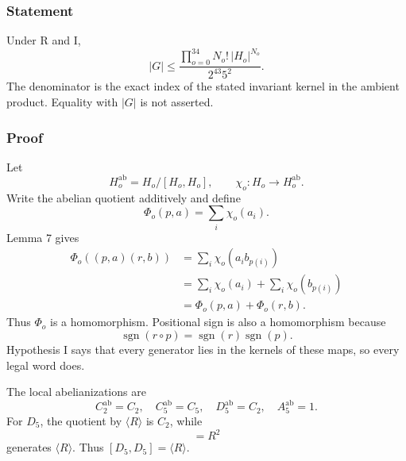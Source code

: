 \documentclass[
  10pt,
  a4paper,
]{article}
\begin{document}
\subsubsection{Statement}\label{statement-7}

Under R and I, \begin{equation}
|G|
\le
\frac{\displaystyle\prod_{o=0}^{34}N_o!\,|H_o|^{N_o}}
{2^{43}5^2}.
\end{equation} The denominator is the exact index of the stated
invariant kernel in the ambient product. Equality with \(|G|\) is not
asserted.

\subsubsection{Proof}\label{proof-7}

Let \begin{equation}
H_o^{\mathrm{ab}}=H_o/[H_o,H_o],
\qquad
\chi_o:H_o\to H_o^{\mathrm{ab}}.
\end{equation} Write the abelian quotient additively and define
\begin{equation}
\Phi_o(p,a)=\sum_i\chi_o(a_i).
\end{equation} Lemma 7 gives \begin{equation}
\begin{aligned}
\Phi_o((p,a)(r,b))
&=\sum_i\chi_o(a_i b_{p(i)})\\
&=\sum_i\chi_o(a_i)+\sum_i\chi_o(b_{p(i)})\\
&=\Phi_o(p,a)+\Phi_o(r,b).
\end{aligned}
\end{equation} Thus \(\Phi_o\) is a homomorphism. Positional sign is
also a homomorphism because \begin{equation}
\operatorname{sgn}(r\circ p)=\operatorname{sgn}(r)\operatorname{sgn}(p).
\end{equation} Hypothesis I says that every generator lies in the
kernels of these maps, so every legal word does.

The local abelianizations are \begin{equation}
C_2^{\mathrm{ab}}=C_2,\quad
C_5^{\mathrm{ab}}=C_5,\quad
D_5^{\mathrm{ab}}=C_2,\quad
A_5^{\mathrm{ab}}=1.
\end{equation} For \(D_5\), the quotient by \(\langle R\rangle\) is
\(C_2\), while \begin{equation}
[R,F]=R^2
\end{equation} generates \(\langle R\rangle\). Thus
\([D_5,D_5]=\langle R\rangle\).
\end{document}
